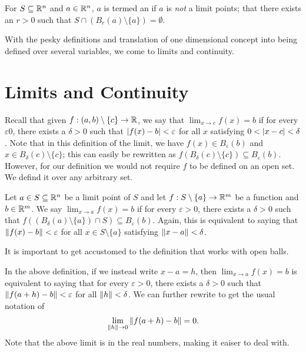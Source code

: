 \begin{definition}
    For $S \subseteq \mathbb{R}^{n}$ and $a \in \mathbb{R}^{n}$, $a$ is termed an  if $a$ is \textit{not} a limit points; that there exists an $r > 0$ such that $S \cap (B_{r}(a) \setminus \{a\}) = \emptyset$.
\end{definition}

With the pesky definitions and translation of one dimensional concept into being defined over several variables, we come to limits and continuity.

\section{Limits and Continuity}
Recall that given $f:(a,b)\setminus\{c\} \to \mathbb{R}$, we say that $\lim_{x \to c}f(x) = b$ if for every $\varepsilon  0$, there exists a $\delta > 0$ such that $\left| f(x)-b \right| < \varepsilon$ for all $x$ satisfying $0 < \left| x-c \right| < \delta$. Note that in this definition of the limit, we have $f(x) \in B_{\varepsilon}(b)$ and $x \in B_{\delta}(c) \setminus \{c\}$; this can easily be rewritten as $f(B_{\delta}(c)\setminus\{c\}) \subseteq B_{\varepsilon}(b)$. However, for our definition we would not require $f$ to be defined on an open set. We defind it over any arbitrary set.

\begin{definition}
    Let $a \in S \subseteq \mathbb{R}^{n}$ be a limit point of $S$ and let $f:S\setminus\{a\} \to \mathbb{R}^{m}$ be a function and $b \in \mathbb{R}^{m}$. We say $\lim_{x \to a} f(x) = b$ if for every $\varepsilon > 0$, there exists a $\delta > 0$ such that $f((B_{\delta}(a)\setminus\{a\}) \cap S) \subseteq B_{\varepsilon}(b)$. Again, this is equivalent to saying that $\left\lVert f(x)-b\right\rVert < \varepsilon$ for all $x \in S\setminus\{a\}$ satisfying $\left\lVert x-a\right\rVert < \delta$.
\end{definition}

It is important to get accustomed to the definition that works with open balls.
\begin{remark}
    In the above definition, if we instead write $x - a = h$, then $\lim_{x \to a} f(x) = b$ is equivalent to saying that for every $\varepsilon > 0$, there exists a $\delta > 0$ such that $\left\lVert f(a+h)-b\right\rVert < \varepsilon$ for all $\left\lVert h\right\rVert < \delta$. We can further rewrite to get the usual notation of
    \begin{align}
        \lim_{\left\lVert h\right\rVert \to 0} \left\lVert f(a+h)-b\right\rVert = 0.
    \end{align}
    Note that the above limit is in the real numbers, making it eaiser to deal with.
\end{remark}

